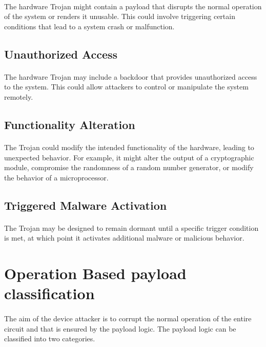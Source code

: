 \paragraph*{}
The hardware Trojan might contain a payload that disrupts the normal operation of the system or renders it unusable. This could involve triggering certain conditions that lead to a system crash or malfunction.

\subsection{Unauthorized Access}
\paragraph*{}
The hardware Trojan may include a backdoor that provides unauthorized access to the system. This could allow attackers to control or manipulate the system remotely.

\subsection{Functionality Alteration}
\paragraph*{}
The Trojan could modify the intended functionality of the hardware, leading to unexpected behavior. For example, it might alter the output of a cryptographic module, compromise the randomness of a random number generator, or modify the behavior of a microprocessor.

\subsection{Triggered Malware Activation}
\paragraph*{}
The Trojan may be designed to remain dormant until a specific trigger condition is met, at which point it activates additional malware or malicious behavior.

\section{Operation Based payload classification}
\paragraph*{}
The aim of the device attacker is to corrupt the normal operation of the entire circuit and that is ensured by the payload logic. The payload logic can be classified into two categories.
